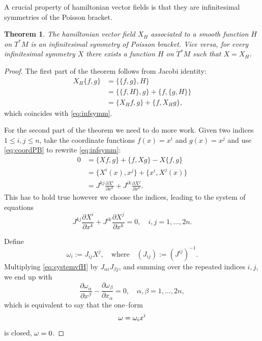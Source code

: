 \documentclass[english,fontsize=11pt,paper=a5,oneside]{scrbook}
\let\d\relax
\newcommand{\d}{\mathrm{d}}
\newtheorem{theorem}{Theorem}[chapter]
\theoremstyle{definition}
\begin{document}
A crucial property of hamiltonian vector fields is that they are infinitesimal symmetries of the Poisson bracket.

\begin{theorem}\label{thm:vf-infsym}
  The hamiltonian vector field $X_H$ associated to a smooth function $H$ on $T^*M$ is an infinitesimal symmetry of Poisson bracket.
  Vice versa, for every infinitesimal symmetry $X$ there exists a function $H$ on $T^*M$ such that $X = X_H$.
\end{theorem}
\begin{proof}
  The first part of the theorem follows from Jacobi identity:
  \begin{align}
    X_H \big\{f,g\big\} & = \big\{\big\{f,g\big\}, H\big\}                                \\
                        & = \big\{\big\{f,H\big\},g\big\} + \big\{f,\big\{g,H\big\}\big\} \\
                        & = \big\{X_Hf,g\big\} + \big\{f,X_Hg\big\},
  \end{align}
  which coincides with \eqref{eq:infsymm}.

  For the second part of the theorem we need to do more work.
  Given two indices $1\leq i,j \leq n$, take the coordinate functions $f(x) = x^i$ and $g(x) = x^j$ and use \eqref{eq:coordPB} to rewrite \eqref{eq:infsymm}:
  \begin{align}
    0 & = \big\{X f,g\big\} + \big\{f, Xg\big\} - X \big\{f,g\big\}                            \\
      & = \big\{X^i(x),x^j\big\} + \big\{x^i,X^j(x)\big\}                                      \\
      & = J^{kj} \frac{\partial X^i}{\partial x^k} + J^{ik} \frac{\partial X^j}{\partial x^k}.
  \end{align}
  This has to hold true however we choose the indices, leading to the system of equations
  \begin{equation}\label{eq:systemvfH}
    J^{kj} \frac{\partial X^i}{\partial x^k} + J^{ik} \frac{\partial X^j}{\partial x^k} = 0, \quad i,j = 1,\ldots,2n.
  \end{equation}

  Define
  \begin{equation}
    \omega_i := J_{ij} X^j, \quad\mbox{where}\quad (J_{ij}) := (J^{ij})^{-1}.
  \end{equation}
  Multiplying \eqref{eq:systemvfH} by $J_{\alpha i} J_{\beta j}$, and summing over the repeated indices $i,j$, we end up with
  \begin{equation}
    \frac{\partial \omega_\alpha}{\partial x^\beta} - \frac{\partial \omega_\beta}{\partial x_\alpha} = 0, \quad \alpha,\beta = 1, \ldots, 2n,
  \end{equation}
  which is equivalent to say that the one--form
  \begin{equation}
    \omega = \omega_i \d x^i
  \end{equation}
  is closed, $\d \omega = 0$.


\end{proof}
\end{document}
